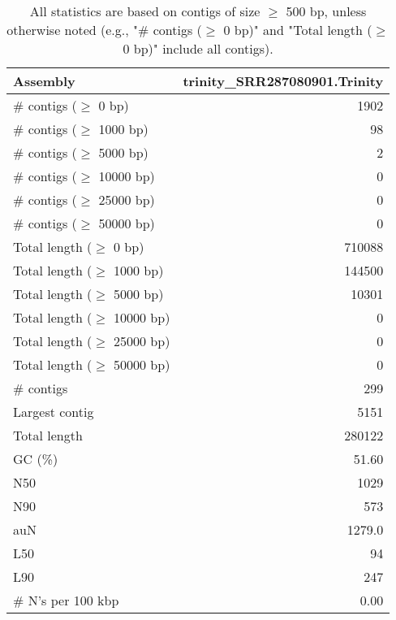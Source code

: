 \documentclass[12pt,a4paper]{article}
\begin{document}
\begin{table}[ht]
\begin{center}
\caption{All statistics are based on contigs of size $\geq$ 500 bp, unless otherwise noted (e.g., "\# contigs ($\geq$ 0 bp)" and "Total length ($\geq$ 0 bp)" include all contigs).}
\begin{tabular}{|l*{1}{|r}|}
\hline
Assembly & trinity\_SRR287080901.Trinity \\ \hline
\# contigs ($\geq$ 0 bp) & 1902 \\ \hline
\# contigs ($\geq$ 1000 bp) & 98 \\ \hline
\# contigs ($\geq$ 5000 bp) & 2 \\ \hline
\# contigs ($\geq$ 10000 bp) & 0 \\ \hline
\# contigs ($\geq$ 25000 bp) & 0 \\ \hline
\# contigs ($\geq$ 50000 bp) & 0 \\ \hline
Total length ($\geq$ 0 bp) & 710088 \\ \hline
Total length ($\geq$ 1000 bp) & 144500 \\ \hline
Total length ($\geq$ 5000 bp) & 10301 \\ \hline
Total length ($\geq$ 10000 bp) & 0 \\ \hline
Total length ($\geq$ 25000 bp) & 0 \\ \hline
Total length ($\geq$ 50000 bp) & 0 \\ \hline
\# contigs & 299 \\ \hline
Largest contig & 5151 \\ \hline
Total length & 280122 \\ \hline
GC (\%) & 51.60 \\ \hline
N50 & 1029 \\ \hline
N90 & 573 \\ \hline
auN & 1279.0 \\ \hline
L50 & 94 \\ \hline
L90 & 247 \\ \hline
\# N's per 100 kbp & 0.00 \\ \hline
\end{tabular}
\end{center}
\end{table}
\end{document}
